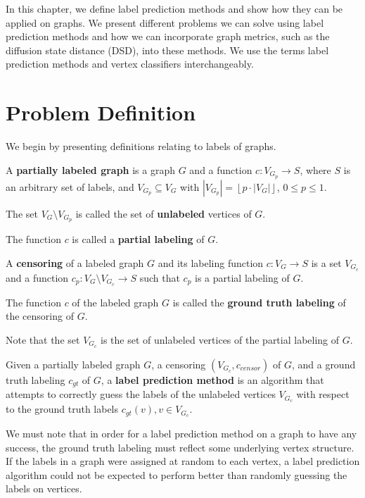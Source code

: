In this chapter, we define label prediction methods and show how they can
be applied on graphs. We present different problems we can solve using
label prediction methods and how we can incorporate graph metrics, such as
the diffusion state distance (DSD), into these methods. We use the terms
label prediction methods and vertex classifiers interchangeably.

\section{Problem Definition}
\label{sec:label_prediction_methods}
We begin by presenting definitions relating to labels of graphs.

\begin{definition}
A \textbf{partially labeled graph} is a graph $G$ and a function
$c : V_{G_p} \to S$, where $S$ is an arbitrary set of labels, and
$V_{G_p} \subseteq V_G$ with
$|V_{G_p}| = \left\lfloor{p \cdot |V_G|}\right\rfloor$, $0 \leq p \leq 1$.

The set $V_G \setminus V_{G_p}$ is called the set of \textbf{unlabeled} 
vertices of $G$.

The function $c$ is called a \textbf{partial labeling} of $G$.
\end{definition}

\begin{definition}
A \textbf{censoring} of a labeled graph $G$ and its labeling function
$c : V_G \to S$ is a set $V_{G_c}$ and a function
$c_p: V_G \setminus V_{G_c} \to S$ such that $c_p$ is a partial labeling
of $G$.

The function $c$ of the labeled graph $G$ is called the
\textbf{ground truth labeling} of the censoring of $G$.

Note that the set $V_{G_c}$ is the set of unlabeled vertices of the
partial labeling of $G$.
\end{definition}

Given a partially labeled graph $G$, a censoring $(V_{G_c}, c_{censor})$
of $G$, and a ground truth labeling $c_{gt}$ of $G$, a 
\textbf{label prediction method} is an algorithm that attempts to correctly 
guess the labels of the unlabeled vertices $V_{G_c}$ with respect to the
ground truth labels $c_{gt}(v), v \in V_{G_c}$.

We must note that in order for a label prediction method on a graph to have
any success, the ground truth labeling must reflect some underlying vertex
structure. If the labels in a graph were assigned at random to each vertex, a 
label prediction algorithm could not be expected to perform better than 
randomly guessing the labels on vertices.

